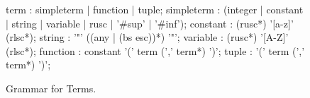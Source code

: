 \begin{figure}
\vspace*{-19mm}
\railnontermfont{\rmfamily\itshape}%
\begin{rail}
  term        : simpleterm | function | tuple;
  simpleterm  : (integer | constant | string | variable | rusc | '\#sup' | '\#inf');
  constant    : (rusc*) '[a-z]' (rlsc*);
  string      : '"' ((any | (bs esc))*) '"';
  variable    : (rusc*) '[A-Z]' (rlsc*);
  function    : constant '(' term (',' term*) ')';
  tuple       :          '(' term (',' term*) ')';
\end{rail}
\caption{Grammar for Terms.\label{fig:terms}}
\end{figure}

